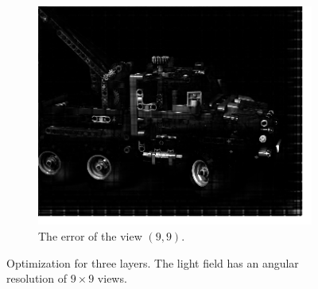 \documentclass[11pt,a4paper,titlepage]{article}
\begin{document}
\begin{figure}[h]
\begin{subfigure}[t]{0.4\textwidth}
		\includegraphics[width=\textwidth]{results/legotruck_perspective_rec_3Layers_r=1/custom_view_error.png}
		\caption{The error of the view $\left( 9, 9 \right)$.}
	\end{subfigure}

	\caption{Optimization for three layers. The light field has an angular resolution of $9\times 9$ views.}
\end{figure}



\clearpage


\end{document}
